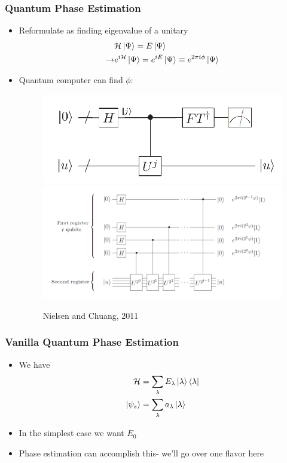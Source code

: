 \documentclass[aspectratio=169]{beamer}
\begin{document}
\begin{frame}
	\frametitle{Quantum Phase Estimation}
	\begin{itemize}[<+->]
		\item Reformulate as finding eigenvalue of a unitary
			\begin{align}\nonumber
				&\mathcal{H}\ket{\Psi}=E\ket{\Psi}\\\rightarrow &e^{i\mathcal{H}}\ket{\Psi} = e^{iE}\ket{\Psi}\equiv e^{2\pi i\phi}\ket{\Psi}\nonumber
			\end{align}
		\item Quantum computer can find $\phi$:
			\begin{figure}
				\includegraphics[width=.45\textwidth]{pea_overall.png}%
				\includegraphics[width=.45\textwidth]{pea_1.png}%
			\caption{Nielsen and Chuang, 2011}
			\end{figure}
        \end{itemize}
\end{frame}

\begin{frame}
\frametitle{Vanilla Quantum Phase Estimation}
\begin{itemize}[<+->]
\item We have 
\begin{align}
\nonumber \mathcal{H} &= \sum_{\lambda}E_\lambda\ket{\lambda}\bra{\lambda}\\
\nonumber \ket{\psi_s} &= \sum_{\lambda}a_\lambda\ket{\lambda}
\end{align} 
\item In the simplest case we want $E_0$
\item Phase estimation can accomplish this- we'll go over one flavor here
\end{itemize}
\end{frame}
\end{document}
